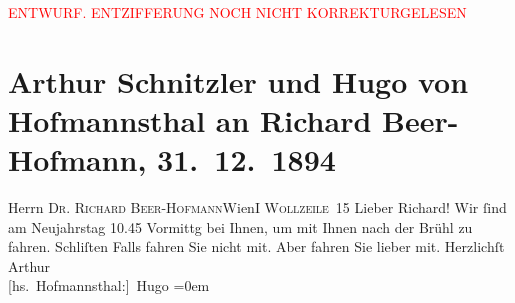 
\begin{center}
            \textcolor{red}{ENTWURF. ENTZIFFERUNG NOCH NICHT KORREKTURGELESEN}
                      \end{center}
            
               \section[Arthur Schnitzler und Hugo von Hofmannsthal an Richard Beer-Hofmann, 31. 12. 1894]{ Arthur Schnitzler und Hugo von Hofmannsthal an Richard
                    Beer-Hofmann, 31. 12. 1894}\nopagebreak{}\rehead{ }\begin{ledgroupsized}[t]{13cm}\normalsize\beginnumbering{} \toendnotes[C]{\smallbreak\pagebreak[2]} 
\pstart{}{\pb}Herrn \textsc{Dr. Richard
                            Beer-Hofmann}\pend{}\pstart{}Wien\pend{}\pstart{}\textsc{I Wollzeile 15}\pend{}{\bigskip}\pstart
           \noindent{}{\pb}Lieber Richard! Wir ſind am Neujahrstag{ }10.45 Vormittg bei Ihnen, um mit Ihnen nach der Brühl zu fahren. Schli{\geminationm}ſten
                    Falls fahren Sie nicht mit. Aber fahren Sie lieber mit.\pend
           \pstart
           Herzlichſt \spacefill\mbox{Arthur}{\\[\baselineskip]}\spacefill\mbox{{[}hs. Hofmannsthal:{]} Hugo}\pend
           \leftskip=0em{}\endnumbering{}\end{ledgroupsized}  \newcommand{\dateiname}{L00413}\newcommand{\titel}{Arthur Schnitzler und Hugo von Hofmannsthal an Richard Beer-Hofmann, 31. 12. 1894}\newcommand{\editorInnen}{ Martin Anton Müller und Gerd-Hermann Susen}
      